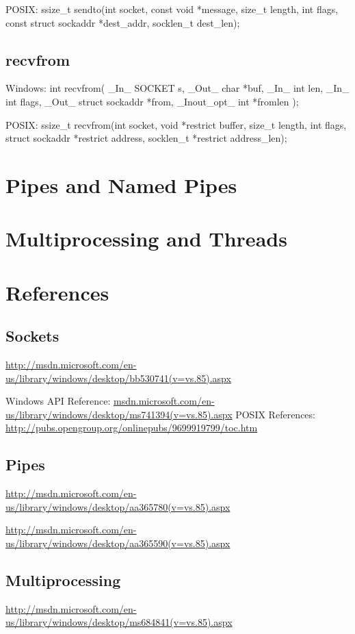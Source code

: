 \documentclass[letterpaper,10pt]{article}
\begin{document}
POSIX:
ssize\_t sendto(int socket, const void *message, size\_t length,
       int flags, const struct sockaddr *dest\_addr,
       socklen\_t dest\_len);

\subsection{recvfrom}
Windows:
int recvfrom(
  \_In\_         SOCKET s,
  \_Out\_        char *buf,
  \_In\_         int len,
  \_In\_         int flags,
  \_Out\_        struct sockaddr *from,
  \_Inout\_opt\_  int *fromlen
);

POSIX:
ssize\_t recvfrom(int socket, void *restrict buffer, size\_t length,
       int flags, struct sockaddr *restrict address,
       socklen\_t *restrict address\_len);

\section{Pipes and Named Pipes}

\section{Multiprocessing and Threads}

\newpage

\section{References}

\subsection{Sockets}
\url{http://msdn.microsoft.com/en-us/library/windows/desktop/bb530741(v=vs.85).aspx}

Windows API Reference: \url{msdn.microsoft.com/en-us/library/windows/desktop/ms741394(v=vs.85).aspx}
POSIX References: \url{http://pubs.opengroup.org/onlinepubs/9699919799/toc.htm}

\subsection{Pipes}
\url{http://msdn.microsoft.com/en-us/library/windows/desktop/aa365780(v=vs.85).aspx}

\url{http://msdn.microsoft.com/en-us/library/windows/desktop/aa365590(v=vs.85).aspx}

\subsection{Multiprocessing}
\url{http://msdn.microsoft.com/en-us/library/windows/desktop/ms684841(v=vs.85).aspx}
\end{document}
